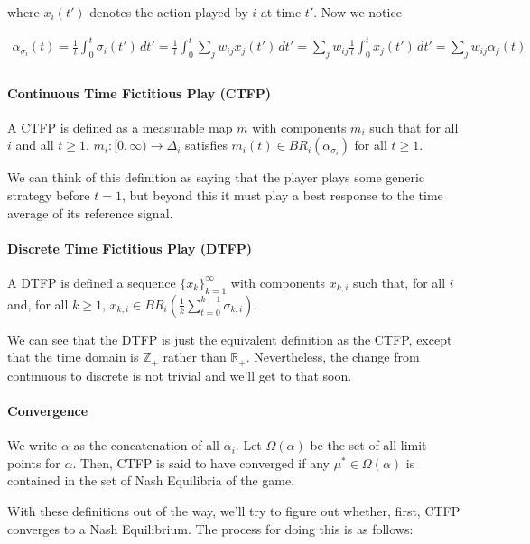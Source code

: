 \documentclass{article}
\theoremstyle{definition}
\begin{document}
	where $x_i(t')$ denotes the action played by $i$ at time $t'$. Now we notice
	
	\begin{align}
		\alpha_{\sigma_i}(t) = \frac{1}{t} \int_{0}^{t} \sigma_i(t') \, dt' = \frac{1}{t} \int_{0}^t \sum_{j} w_{ij} x_j(t') \, dt' = \sum_{j} w_{ij} \frac{1}{t} \int_{0}^t x_j(t') \, dt' = \sum_{j} w_{ij} \alpha_j(t) \nonumber \\
	\end{align}
	
	\paragraph{Continuous Time Fictitious Play (CTFP)} A CTFP is defined as a measurable map $m$ with components $m_i$ such that for all $i$ and all $t \geq 1$, $m_i: [0, \infty) \rightarrow \Delta_i$ satisfies $m_i(t) \in BR_i(\alpha_{\sigma_i})$ for all $t \geq 1$.
	
	We can think of this definition as saying that the player plays some generic strategy before $t = 1$, but beyond this it must play a best response to the time average of its reference signal.
	
	\paragraph{Discrete Time Fictitious Play (DTFP)} A DTFP is defined a sequence $\{x_{k}\}_{k=1}^{\infty}$ with components $x_{k, i}$ such that, for all $i$ and, for all $k \geq 1$, $x_{k, i} \in BR_i\left( \frac{1}{k} \sum_{t = 0}^{k - 1} \sigma_{k, i} \right)$.
	
	We can see that the DTFP is just the equivalent definition as the CTFP, except that the time domain is $\mathbb{Z}_+$ rather than $\mathbb{R}_+$. Nevertheless, the change from continuous to discrete is not trivial and we'll get to that soon.
	
	\paragraph{Convergence} We write $\alpha$ as the concatenation of all $\alpha_i$. Let $\Omega(\alpha)$ be  the set of all limit points for $\alpha$. Then, CTFP is said to have converged if any $\mu^* \in \Omega(\alpha)$ is contained in the set of Nash Equilibria of the game.
	
	With these definitions out of the way, we'll try to figure out whether, first, CTFP converges to a Nash Equilibrium. The process for doing this is as follows:
	
\end{document}
